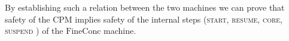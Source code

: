 

By establishing such a relation between the two machines we can prove
that safety of the $\mathrm{CPM}$ implies safety of the internal
steps (\textsc{start, resume, core, suspend%
})
 of the $\mathrm{FineConc}$ machine.

